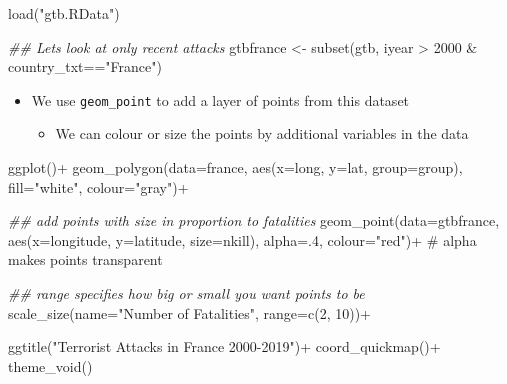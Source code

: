 \documentclass[
  letterpaper,
  DIV=11,
  numbers=noendperiod]{scrreprt}
\newenvironment{Shaded}{\begin{snugshade}}{\end{snugshade}}
\newcommand{\AttributeTok}[1]{\textcolor[rgb]{0.40,0.45,0.13}{#1}}
\newcommand{\CommentTok}[1]{\textcolor[rgb]{0.37,0.37,0.37}{#1}}
\newcommand{\DecValTok}[1]{\textcolor[rgb]{0.68,0.00,0.00}{#1}}
\newcommand{\DocumentationTok}[1]{\textcolor[rgb]{0.37,0.37,0.37}{\textit{#1}}}
\newcommand{\FunctionTok}[1]{\textcolor[rgb]{0.28,0.35,0.67}{#1}}
\newcommand{\NormalTok}[1]{\textcolor[rgb]{0.00,0.23,0.31}{#1}}
\newcommand{\OtherTok}[1]{\textcolor[rgb]{0.00,0.23,0.31}{#1}}
\newcommand{\SpecialCharTok}[1]{\textcolor[rgb]{0.37,0.37,0.37}{#1}}
\newcommand{\StringTok}[1]{\textcolor[rgb]{0.13,0.47,0.30}{#1}}
\providecommand{\tightlist}{%
  \setlength{\itemsep}{0pt}\setlength{\parskip}{0pt}}\usepackage{longtable,booktabs,array}
\begin{document}
\begin{Shaded}
\begin{Highlighting}[]
\FunctionTok{load}\NormalTok{(}\StringTok{"gtb.RData"}\NormalTok{)}
\end{Highlighting}
\end{Shaded}

\begin{Shaded}
\begin{Highlighting}[]
\DocumentationTok{\#\# Let\textquotesingle{}s look at only recent attacks }
\NormalTok{gtbfrance }\OtherTok{\textless{}{-}} \FunctionTok{subset}\NormalTok{(gtb, iyear }\SpecialCharTok{\textgreater{}} \DecValTok{2000} \SpecialCharTok{\&}\NormalTok{ country\_txt}\SpecialCharTok{==}\StringTok{"France"}\NormalTok{)}
\end{Highlighting}
\end{Shaded}

\begin{itemize}
\tightlist
\item
  We use \texttt{geom\_point} to add a layer of points from this dataset

  \begin{itemize}
  \tightlist
  \item
    We can colour or size the points by additional variables in the data
  \end{itemize}
\end{itemize}

\begin{Shaded}
\begin{Highlighting}[]
\FunctionTok{ggplot}\NormalTok{()}\SpecialCharTok{+}
  \FunctionTok{geom\_polygon}\NormalTok{(}\AttributeTok{data=}\NormalTok{france, }\FunctionTok{aes}\NormalTok{(}\AttributeTok{x=}\NormalTok{long, }\AttributeTok{y=}\NormalTok{lat, }\AttributeTok{group=}\NormalTok{group), }\AttributeTok{fill=}\StringTok{"white"}\NormalTok{, }\AttributeTok{colour=}\StringTok{"gray"}\NormalTok{)}\SpecialCharTok{+}
  
  
  \DocumentationTok{\#\# add points with size in proportion to fatalities}
  \FunctionTok{geom\_point}\NormalTok{(}\AttributeTok{data=}\NormalTok{gtbfrance, }\FunctionTok{aes}\NormalTok{(}\AttributeTok{x=}\NormalTok{longitude, }\AttributeTok{y=}\NormalTok{latitude, }\AttributeTok{size=}\NormalTok{nkill), }
             \AttributeTok{alpha=}\NormalTok{.}\DecValTok{4}\NormalTok{, }\AttributeTok{colour=}\StringTok{"red"}\NormalTok{)}\SpecialCharTok{+} \CommentTok{\# alpha makes points transparent}
  
  \DocumentationTok{\#\# range specifies how big or small you want points to be}
  \FunctionTok{scale\_size}\NormalTok{(}\AttributeTok{name=}\StringTok{"Number of Fatalities"}\NormalTok{, }\AttributeTok{range=}\FunctionTok{c}\NormalTok{(}\DecValTok{2}\NormalTok{, }\DecValTok{10}\NormalTok{))}\SpecialCharTok{+}


  \FunctionTok{ggtitle}\NormalTok{(}\StringTok{"Terrorist Attacks in France 2000{-}2019"}\NormalTok{)}\SpecialCharTok{+}
  \FunctionTok{coord\_quickmap}\NormalTok{()}\SpecialCharTok{+}
  \FunctionTok{theme\_void}\NormalTok{()}
\end{Highlighting}
\end{Shaded}
\end{document}
